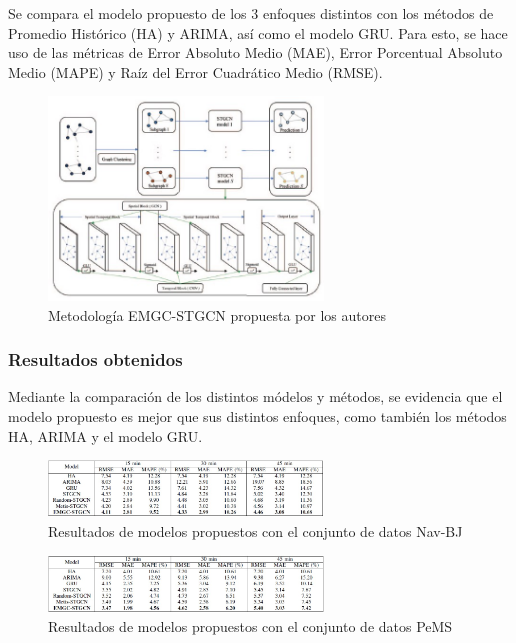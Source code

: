 Se compara el modelo propuesto de los 3 enfoques distintos con los métodos de Promedio Histórico (HA) y ARIMA, así como el modelo GRU. Para esto, se hace uso de las métricas de Error Absoluto Medio (MAE), Error Porcentual Absoluto Medio (MAPE) y Raíz del Error Cuadrático Medio (RMSE).
\begin{figure}[h]
	\begin{center}
		\includegraphics[width=0.65\textwidth]{2/figures/CLUSTER.jpg}
		\caption{Metodología EMGC-STGCN propuesta por los autores}
		\label{1:fig2}
	\end{center}
\end{figure}
\subsubsection{Resultados obtenidos}
Mediante la comparación de los distintos módelos y métodos, se evidencia que el modelo propuesto es mejor que sus distintos enfoques, como también los métodos HA, ARIMA y el modelo GRU.
 
\begin{figure}[h]
	\begin{center}
		\includegraphics[width=0.65\textwidth]{2/figures/clusterRE1.jpg}
		\caption{Resultados de modelos propuestos con el conjunto de datos Nav-BJ}
		\label{1:fig2}
	\end{center}
\end{figure}
\begin{figure}[h]
	\begin{center}
		\includegraphics[width=0.65\textwidth]{2/figures/clusterRE2.jpg}
		\caption{Resultados de modelos propuestos con el conjunto de datos PeMS}
		\label{1:fig2}
	\end{center}
\end{figure}

